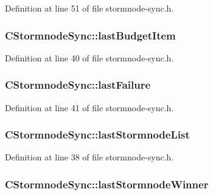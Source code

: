 Definition at line 51 of file stormnode-\/sync.\+h.

\hypertarget{class_c_stormnode_sync_a5499eabbf28dc8ec6f77cfef1569dbb7}{}
\subsubsection[{last\+Budget\+Item}]{ C\+Stormnode\+Sync\+::last\+Budget\+Item}\label{class_c_stormnode_sync_a5499eabbf28dc8ec6f77cfef1569dbb7}


Definition at line 40 of file stormnode-\/sync.\+h.

\hypertarget{class_c_stormnode_sync_a8b236ed2df48f8d8fdbec1e07872f34f}{}
\subsubsection[{last\+Failure}]{ C\+Stormnode\+Sync\+::last\+Failure}\label{class_c_stormnode_sync_a8b236ed2df48f8d8fdbec1e07872f34f}


Definition at line 41 of file stormnode-\/sync.\+h.

\hypertarget{class_c_stormnode_sync_aeb0a6f0e92f6f1f25c5d9fa6c2b15bbd}{}
\subsubsection[{last\+Stormnode\+List}]{ C\+Stormnode\+Sync\+::last\+Stormnode\+List}\label{class_c_stormnode_sync_aeb0a6f0e92f6f1f25c5d9fa6c2b15bbd}


Definition at line 38 of file stormnode-\/sync.\+h.

\hypertarget{class_c_stormnode_sync_a84ac2bc44ac623f8e679f2ba58034c7a}{}
\subsubsection[{last\+Stormnode\+Winner}]{ C\+Stormnode\+Sync\+::last\+Stormnode\+Winner}\label{class_c_stormnode_sync_a84ac2bc44ac623f8e679f2ba58034c7a}


